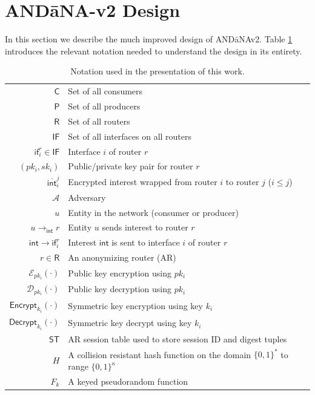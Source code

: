 \section{AND\=aNA-v2 Design} \label{sec:design}
In this section we describe the much improved design of {\sf AND\=aNAv2}. Table \ref{tab:notation} introduces the relevant notation needed to understand the design in its entirety. 

\begin{table}
\centering
\caption{Notation used in the presentation of this work.}
\label{tab:notation}
  \begin{tabular}{| r | l |} \hline
  $\mathsf{C}$ & Set of all consumers  \\
  $\mathsf{P}$ & Set of all producers  \\ 
  $\mathsf{R}$ & Set of all routers  \\
  $\mathsf{IF}$ & Set of all interfaces on all routers  \\
  $\mathsf{if}_i^r \in \mathsf{IF}$ & Interface $i$ of router $r$  \\
  $(pk_i, sk_i)$ & Public/private key pair for router $r$  \\
  $\overline{\mathsf{int}}_{i}^{j}$ & Encrypted interest wrapped from router $i$ to router $j$ ($i \leq j$)  \\
  $\mathcal{A}$ & Adversary \\ 
  $u$ & Entity in the network (consumer or producer) \\
  $u \to_{\mathsf{int}} r$ & Entity $u$ sends interest to router $r$  \\ 
  $\mathsf{int} \to \mathsf{if}_i^r$ & Interest $\mathsf{int}$ is sent to interface $i$ of router $r$ \\
  $r \in \mathsf{R}$ & An anonymizing router (AR) \\ 
  $\mathcal{E}_{pk_i}(\cdot)$ & Public key encryption using $pk_i$ \\ 
  $\mathcal{D}_{pk_i}(\cdot)$ & Public key decryption using $pk_i$ \\ 
  $\mathsf{Encrypt}_{k_i}(\cdot)$ & Symmetric key encryption using key $k_i$ \\ 
  $\mathsf{Decrypt}_{k_i}(\cdot)$ & Symmetric key decrypt using key $k_i$ \\ 
  $\mathsf{ST}$ & AR session table used to store session ID and digest tuples \\
  $H$ & A collision resistant hash function on the domain $\{0,1\}^*$ to range $\{0,1\}^{\kappa}$ \\
  $F_k$ & A keyed pseudorandom function \\ \hline
  \end{tabular}
\end{table}

